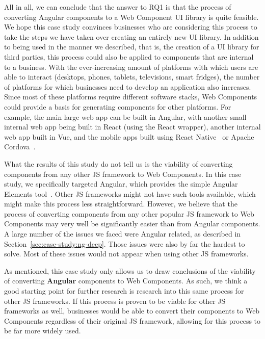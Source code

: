 All in all, we can conclude that the answer to RQ1 is that the process of converting Angular components to a Web Component UI library is quite feasible. We hope this case study convinces businesses who are considering this process to take the steps we have taken over creating an entirely new UI library. In addition to being used in the manner we described, that is, the creation of a UI library for third parties, this process could also be applied to components that are internal to a business. With the ever-increasing amount of platforms with which users are able to interact (desktops, phones, tablets, televisions, smart fridges), the number of platforms for which businesses need to develop an application also increases. Since most of these platforms require different software stacks, Web Components could provide a basis for generating components for other platforms. For example, the main large web app can be built in Angular, with another small internal web app being built in React (using the React wrapper), another internal web app built in Vue, and the mobile apps built using React Native~ or Apache Cordova~.

What the results of this study do not tell us is the viability of converting components from any other JS framework to Web Components. In this case study, we specifically targeted Angular, which provides the simple Angular Elements tool~. Other JS frameworks might not have such tools available, which might make this process less straightforward. However, we believe that the process of converting components from any other popular JS framework to Web Components may very well be significantly easier than from Angular components. A large number of the issues we faced were Angular related, as described in Section~\ref{sec:case-study:ng-deep}. Those issues were also by far the hardest to solve. Most of these issues would not appear when using other JS frameworks.

As mentioned, this case study only allows us to draw conclusions of the viability of converting \textbf{Angular} components to Web Components. As such, we think a good starting point for further research is research into this same process for other JS frameworks. If this process is proven to be viable for other JS frameworks as well, businesses would be able to convert their components to Web Components regardless of their original JS framework, allowing for this process to be far more widely used.